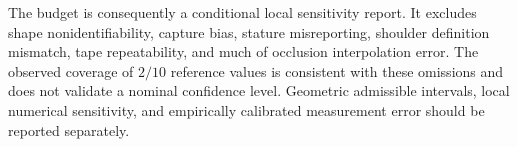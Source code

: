 The budget is consequently a conditional local sensitivity report. It excludes shape nonidentifiability, capture bias, stature misreporting, shoulder definition mismatch, tape repeatability, and much of occlusion interpolation error. The observed coverage of $2/10$ reference values is consistent with these omissions and does not validate a nominal confidence level. Geometric admissible intervals, local numerical sensitivity, and empirically calibrated measurement error should be reported separately.

